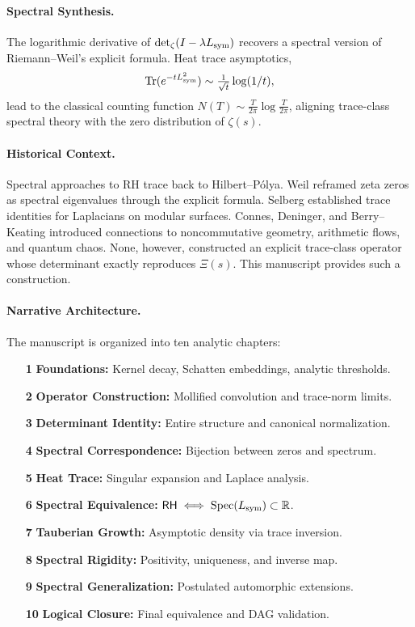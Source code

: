\paragraph*{Spectral Synthesis.}
The logarithmic derivative of \( \det\nolimits_{\zeta}(I - \lambda L_{\mathrm{sym}}) \) recovers a spectral version of Riemann–Weil's explicit formula. Heat trace asymptotics,
\[
\operatorname{Tr}(e^{-t L_{\mathrm{sym}}^2}) \sim \tfrac{1}{\sqrt{t}} \log(1/t),
\]
lead to the classical counting function \( N(T) \sim \tfrac{T}{2\pi} \log \tfrac{T}{2\pi} \), aligning trace-class spectral theory with the zero distribution of \( \zeta(s) \).

\paragraph*{Historical Context.}
Spectral approaches to RH trace back to Hilbert–Pólya. Weil reframed zeta zeros as spectral eigenvalues through the explicit formula. Selberg established trace identities for Laplacians on modular surfaces. Connes, Deninger, and Berry–Keating introduced connections to noncommutative geometry, arithmetic flows, and quantum chaos. None, however, constructed an explicit trace-class operator whose determinant exactly reproduces \( \Xi(s) \). This manuscript provides such a construction.

\paragraph*{Narrative Architecture.}
The manuscript is organized into ten analytic chapters:

\begin{itemize}
  \item[\textbf{1}] \textbf{Foundations:} Kernel decay, Schatten embeddings, analytic thresholds.
  \item[\textbf{2}] \textbf{Operator Construction:} Mollified convolution and trace-norm limits.
  \item[\textbf{3}] \textbf{Determinant Identity:} Entire structure and canonical normalization.
  \item[\textbf{4}] \textbf{Spectral Correspondence:} Bijection between zeros and spectrum.
  \item[\textbf{5}] \textbf{Heat Trace:} Singular expansion and Laplace analysis.
  \item[\textbf{6}] \textbf{Spectral Equivalence:} \( \mathsf{RH} \iff \operatorname{Spec}(L_{\mathrm{sym}}) \subset \mathbb{R} \).
  \item[\textbf{7}] \textbf{Tauberian Growth:} Asymptotic density via trace inversion.
  \item[\textbf{8}] \textbf{Spectral Rigidity:} Positivity, uniqueness, and inverse map.
  \item[\textbf{9}] \textbf{Spectral Generalization:} Postulated automorphic extensions.
  \item[\textbf{10}] \textbf{Logical Closure:} Final equivalence and DAG validation.
\end{itemize}

